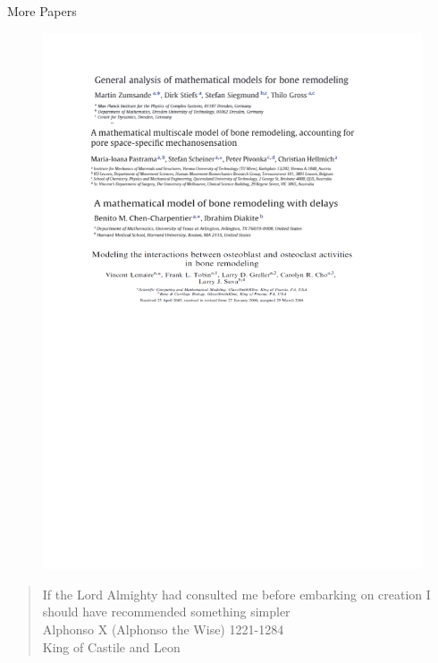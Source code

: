 \documentclass{beamer}
\begin{document}
\begin{frame}{More Papers}
	\begin{figure}[h]
		\centering
			\includegraphics[scale=0.45]{../Figures/fig_papers_combined4-7.png}
	\end{figure}
\end{frame}


\begin{frame}{}
	\begin{quote}
		If the Lord Almighty had consulted me before embarking on creation I should have recommended something simpler\\
		Alphonso X (Alphonso the Wise) 1221-1284\\
		King of Castile and Leon
	\end{quote}
	
\end{frame}	



	
	
\end{document}
